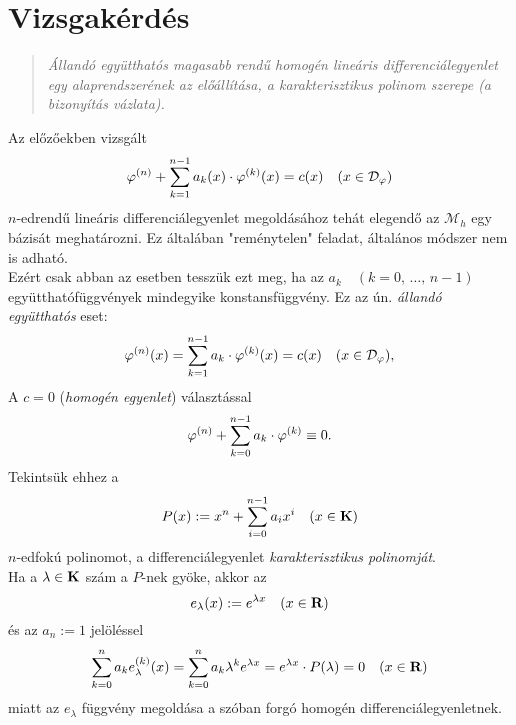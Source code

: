 \newpage
\section{Vizsgakérdés}
\begin{quote}
	\textit{Állandó együtthatós magasabb rendű homogén lineáris differenciálegyenlet egy alaprendszerének az előállítása, a karakterisztikus polinom szerepe (a bizonyítás vázlata).}
\end{quote}

Az előzőekben vizsgált
\[
	\varphi^{(n)} + \sum_{k=1}^{n-1} a_k(x) \cdot \varphi^{(k)}(x) = c(x) \quad (x \in \mathcal{D}_\varphi)
\]
$n$-edrendű lineáris differenciálegyenlet megoldásához tehát elegendő az $\mathcal{M}_h$ egy bázisát meghatározni. Ez általában "reménytelen" feladat, általános módszer nem is adható.\\

Ezért csak abban az esetben tesszük ezt meg, ha az $a_k \quad (k = 0, \, \dots, \, n-1)$ együtthatófüggvények mindegyike konstansfüggvény. Ez az ún. \textit{állandó együtthatós} eset:
\[
	\varphi^{(n)}(x) = \sum_{k=1}^{n-1} a_k \cdot \varphi^{(k)}(x) = c(x) \quad (x \in \mathcal{D}_\varphi),
\]
A $c=0$ (\textit{homogén egyenlet}) választással
\[
	\varphi^{(n)} + \sum_{k=0}^{n-1} a_k \cdot \varphi^{(k)} \equiv 0.
\]
Tekintsük ehhez a
\[
	P(x) := x^n + \sum_{i=0}^{n-1} a_i x^i \quad (x \in \mathbf{K})
\]
$n$-edfokú polinomot, a differenciálegyenlet \textit{karakterisztikus polinomját}.\\

Ha a $\lambda \in \mathbf{K}$ szám a $P$-nek gyöke, akkor az
\[
	e_\lambda(x) := e^{\lambda x} \quad (x \in \mathbf{R})
\]
és az $a_n := 1$ jelöléssel
\[
	\sum_{k=0}^n a_k e_\lambda^{(k)}(x) = \sum_{k=0}^n a_k \lambda^k e^{\lambda x} = e^{\lambda x} \cdot P(\lambda) = 0 \quad (x \in \mathbf{R})
\]
miatt az $e_\lambda$ függvény megoldása a szóban forgó homogén differenciálegyenletnek.\\

